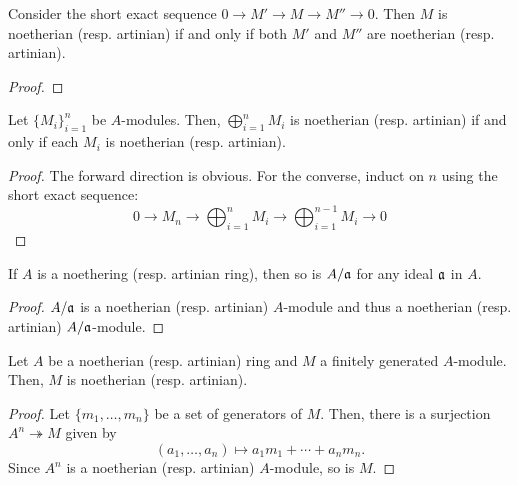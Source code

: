 \begin{lemma}[2/3-lemma]
    Consider the short exact sequence $0\rightarrow M'\rightarrow M\rightarrow M''\rightarrow 0$. Then $M$ is noetherian (resp. artinian) if and only if both $M'$ and $M''$ are noetherian (resp. artinian).
\end{lemma}
\begin{proof}
    
\end{proof}
\begin{corollary}
    Let $\{M_i\}_{i = 1}^n$ be $A$-modules. Then, $\displaystyle\bigoplus_{i = 1}^n M_i$ is noetherian (resp. artinian) if and only if each $M_i$ is noetherian (resp. artinian).
\end{corollary}
\begin{proof}
    The forward direction is obvious. For the converse, induct on $n$ using the short exact sequence: 
    \begin{equation*}
        0\longrightarrow M_n\longrightarrow\bigoplus_{i = 1}^n M_i\longrightarrow\bigoplus_{i = 1}^{n - 1}M_i\longrightarrow 0
    \end{equation*}
\end{proof}

\begin{proposition}
    If $A$ is a noethering (resp. artinian ring), then so is $A/\mathfrak a$ for any ideal $\mathfrak a$ in $A$.
\end{proposition}
\begin{proof}
    $A/\mathfrak a$ is a noetherian (resp. artinian) $A$-module and thus a noetherian (resp. artinian) $A/\mathfrak a$-module.
\end{proof}

\begin{proposition}
    Let $A$ be a noetherian (resp. artinian) ring and $M$ a finitely generated $A$-module. Then, $M$ is noetherian (resp. artinian).
\end{proposition}
\begin{proof}
    Let $\{m_1,\ldots,m_n\}$ be a set of generators of $M$. Then, there is a surjection $A^n\twoheadrightarrow M$ given by 
    \[(a_1,\ldots,a_n)\mapsto a_1m_1 + \cdots + a_nm_n.\] 
    Since $A^n$ is a noetherian (resp. artinian) $A$-module, so is $M$.
\end{proof}

